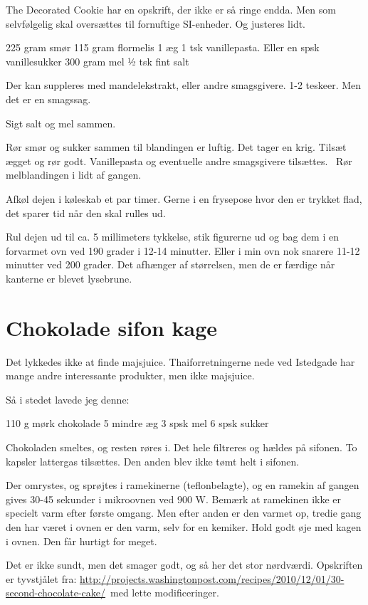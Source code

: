 \documentclass[
]{book}
\begin{document}
The Decorated Cookie har en opskrift, der ikke er så ringe endda. Men som selvfølgelig skal oversættes til fornuftige SI-enheder. Og justeres lidt.

225 gram smør
115 gram flormelis
1 æg
1 tsk vanillepasta. Eller en spsk vanillesukker
300 gram mel
½ tsk fint salt

Der kan suppleres med mandelekstrakt, eller andre smagsgivere. 1-2 teskeer. Men det er en smagssag.

Sigt salt og mel sammen.

Rør smør og sukker sammen til blandingen er luftig. Det tager en krig. Tilsæt ægget og rør godt. Vanillepasta og eventuelle andre smagsgivere tilsættes.~ Rør melblandingen i lidt af gangen.

Afkøl dejen i køleskab et par timer. Gerne i en frysepose hvor den er trykket flad, det sparer tid når den skal rulles ud.

Rul dejen ud til ca. 5 millimeters tykkelse, stik figurerne ud og bag dem i en forvarmet ovn ved 190 grader i 12-14 minutter. Eller i min ovn nok snarere 11-12 minutter ved 200 grader. Det afhænger af størrelsen, men de er færdige når kanterne er blevet lysebrune.

\hypertarget{chokolade-sifon-kage-1}{%
\section{Chokolade sifon kage}\label{chokolade-sifon-kage-1}}

Det lykkedes ikke at finde majsjuice. Thaiforretningerne nede ved Istedgade har mange andre interessante produkter, men ikke majsjuice.

Så i stedet lavede jeg denne:

110 g mørk chokolade
5 mindre æg
3 spsk mel
6 spsk sukker

Chokoladen smeltes, og resten røres i. Det hele filtreres og hældes på sifonen. To kapsler lattergas tilsættes. Den anden blev ikke tømt helt i sifonen.

Der omrystes, og sprøjtes i ramekinerne (teflonbelagte), og en ramekin af gangen gives 30-45 sekunder i mikroovnen ved 900 W. Bemærk at ramekinen ikke er specielt varm efter første omgang. Men efter anden er den varmet op, tredie gang den har været i ovnen er den varm, selv for en kemiker. Hold godt øje med kagen i ovnen. Den får hurtigt for meget.

Det er ikke sundt, men det smager godt, og så her det stor nørdværdi. Opskriften er tyvstjålet fra: \url{http://projects.washingtonpost.com/recipes/2010/12/01/30-second-chocolate-cake/}~med lette modificeringer.
\end{document}
